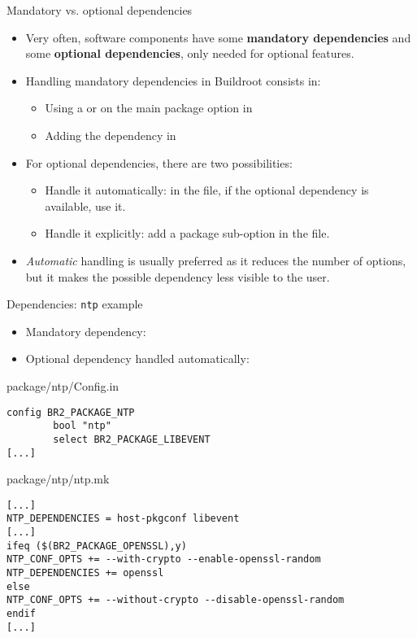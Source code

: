 \begin{frame}{Mandatory vs. optional dependencies}

  \begin{itemize}
  \item Very often, software components have some {\bf mandatory
      dependencies} and some {\bf optional dependencies}, only needed
    for optional features.
  \item Handling mandatory dependencies in Buildroot consists in:
    \begin{itemize}
    \item Using a  or  on the main
      package option in 
    \item Adding the dependency in 
    \end{itemize}
  \item For optional dependencies, there are two possibilities:
    \begin{itemize}
    \item Handle it automatically: in the  file, if the
      optional dependency is available, use it.
    \item Handle it explicitly: add a package sub-option in the
       file.
    \end{itemize}
  \item {\em Automatic} handling is usually preferred as it reduces
    the number of  options, but it makes the possible
    dependency less visible to the user.
  \end{itemize}
\end{frame}

\begin{frame}[fragile]{Dependencies: {\tt ntp} example}

  \begin{itemize}
  \item Mandatory dependency: 
  \item Optional dependency handled automatically: 
  \end{itemize}

\begin{block}{package/ntp/Config.in}
{\scriptsize
\begin{verbatim}
config BR2_PACKAGE_NTP
        bool "ntp"
        select BR2_PACKAGE_LIBEVENT
[...]
\end{verbatim}}
\end{block}

\begin{block}{package/ntp/ntp.mk}
\begin{verbatim}
[...]
NTP_DEPENDENCIES = host-pkgconf libevent
[...]
ifeq ($(BR2_PACKAGE_OPENSSL),y)
NTP_CONF_OPTS += --with-crypto --enable-openssl-random
NTP_DEPENDENCIES += openssl
else
NTP_CONF_OPTS += --without-crypto --disable-openssl-random
endif
[...]
\end{verbatim}
\end{block}

\end{frame}

